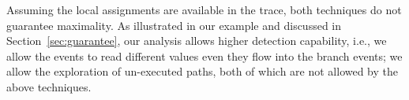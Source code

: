 Assuming the local assignments are available in the trace, both techniques do not guarantee maximality. As illustrated in our example and discussed in Section~\ref{sec:guarantee}, our analysis allows higher detection capability, i.e., we allow the events to read different values even they flow into the branch events; we allow the exploration of un-executed paths, both of which are not allowed by the above techniques.
 


